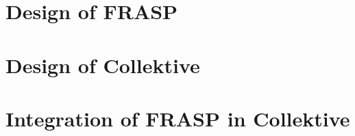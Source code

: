 \section{Design of FRASP}


\section{Design of Collektive}


\section{Integration of FRASP in Collektive}